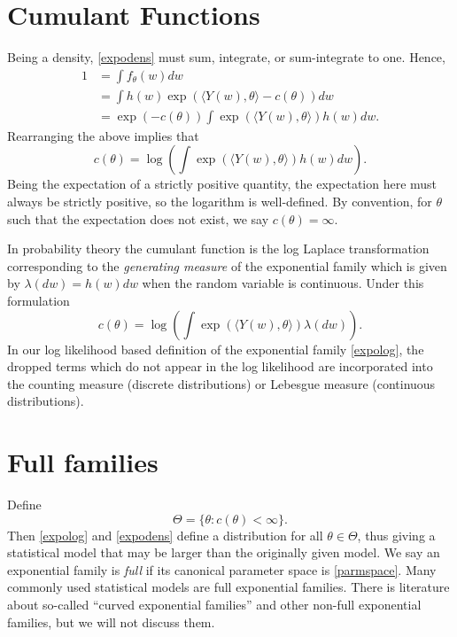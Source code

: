 \documentclass[12pt]{article}
\newcommand{\inner}[1]{\langle #1 \rangle}
\begin{document}
\section*{Cumulant Functions}
Being a density, \eqref{expodens} must sum, integrate, or sum-integrate to one. Hence, 
\begin{align*}
	1 &= \int f_\theta(w) dw \\ 
	  &= \int h(w)\exp\left(\inner{Y(w),\theta} - c(\theta)\right) dw \\
	  &= \exp\left(-c(\theta)\right) \int \exp\left(\inner{Y(w),\theta}\right) h(w) dw.
\end{align*}
Rearranging the above implies that 
$$
  c(\theta) = \log\left(\int \exp\left(\inner{Y(w),\theta}\right) h(w) dw\right).
$$
Being the expectation of a strictly positive quantity, the expectation here must always be strictly positive, so the logarithm is well-defined. By convention, for $\theta$ such that the expectation does not exist, we say $c(\theta) = \infty$.

In probability theory the cumulant function is the log Laplace transformation corresponding to the \emph{generating measure} of the exponential family which is given by $\lambda(dw) = h(w)dw$ when the random variable is continuous. Under this formulation
$$
  c(\theta) = \log\left(\int \exp\left(\inner{Y(w),\theta}\right) \lambda(dw)\right).
$$
In our log likelihood based definition of the exponential family \eqref{expolog}, the dropped terms which do not appear in the log likelihood are incorporated into the counting measure (discrete distributions) or Lebesgue measure (continuous distributions).



\section*{Full families}
Define
\begin{equation} \label{parmspace}
  \Theta = \{ \theta : c(\theta) < \infty \}	.
\end{equation}
Then \eqref{expolog} and \eqref{expodens} define a distribution for all $\theta \in \Theta$, thus giving a statistical model that may be larger than the originally given model. We say an exponential family is \emph{full} if its canonical parameter space is \eqref{parmspace}. Many commonly used statistical models are full exponential families. There is literature about so-called ``curved exponential families'' and other non-full exponential families, but we will not discuss them.
\end{document}
